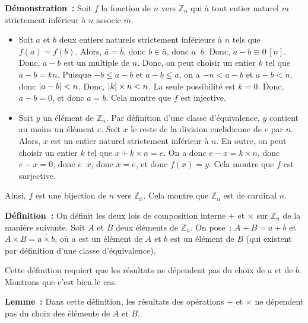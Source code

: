 \noindent\textbf{Démonstration :}
    Soit $f$ la fonction de $n$ vers $\mathbb{Z}_n$ qui à tout entier naturel $m$ strictement inférieur à $n$ associe $\bar{m}$.
    \begin{itemize}
        \item Soit $a$ et $b$ deux entiers naturels strictement inférieurs à $n$ tels que $f(a) = f(b)$.
            Alors, $\bar{a} = \bar{b}$, donc $b \in \bar{a}$, donc $a \mathop{R_n} b$.
            Donc, $a - b \equiv 0 \, [n]$.
            Donc, $a - b$ est un multiple de $n$.
            Donc, on peut choisir un entier $k$ tel que $a-b = k n$.
            Puisque $-b \leq a-b$ et $a-b \leq a$, on a $-n < a-b$ et $a-b < n$, donc $\left\lvert a-b \right\rvert < n$. 
            Donc, $\left\lvert k \right\rvert \times n < n$. 
            La seule possibilité est $k = 0$. 
            Donc, $a - b = 0$, et donc $a = b$.
            Cela montre que $f$ est injective.
        \item Soit $y$ un élément de $\mathbb{Z}_n$.
            Par définition d'une classe d'équivalence, $y$ contient au moins un élément $e$.
            Soit $x$ le reste de la division euclidienne de $e$ par $n$.
            Alors, $x$ est un entier naturel strictement inférieur à $n$. 
            En outre, on peut choisir un entier $k$ tel que $x + k \times n = e$.
            On a donc $e - x = k \times n$, donc $e - x = 0$, donc $e \mathop{R_n} x$, donc $\bar{x} = \bar{e}$, et donc $f(x) = y$.
            Cela montre que $f$ est surjective.
    \end{itemize}
    Ainsi, $f$ est une bijection de $n$ vers $\mathbb{Z_n}$.
    Cela montre que $\mathbb{Z}_n$ est de cardinal $n$.

    \done

\medskip

\noindent\textbf{Définition :} On définit les deux lois de composition interne $+$ et $\times$ sur $\mathbb{Z}_n$ de la manière suivante.
    Soit $A$ et $B$ deux éléments de $\mathbb{Z}_n$.
    On pose : $A + B = \overline{a + b}$ et $A \times B = \overline{a \times b}$, où $a$ est un élément de $A$ et $b$ est un élément de $B$ (qui existent par définition d'une classe d'équivalence). 

\medskip

Cette définition requiert que les résultats ne dépendent pas du choix de $a$ et de $b$. 
Montrons que c'est bien le cas. 

\medskip

\noindent\textbf{Lemme :} Dans cette définition, les résultats des opérations $+$ et $\times$ ne dépendent pas du choix des éléments de $A$ et $B$.

